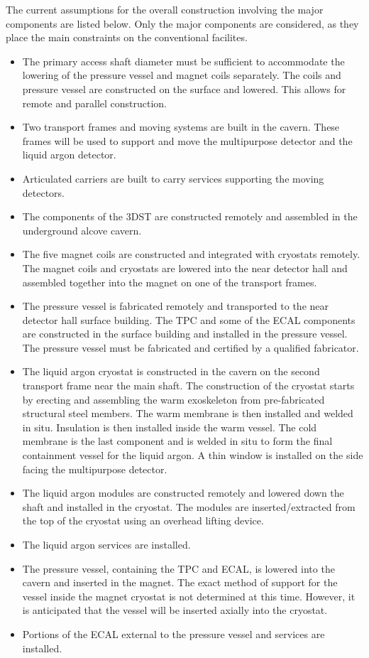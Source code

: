 The current assumptions for the overall construction involving the major components are listed below.  Only the major components are considered, as they place the main constraints on the conventional facilites.
\begin{itemize}
    \item The primary access shaft diameter must be sufficient to  accommodate the lowering of the pressure vessel and magnet coils separately. The coils and pressure vessel are constructed on the surface and lowered. This allows for remote and parallel construction.
    \item Two transport frames and moving systems are built in the cavern.  These frames will be used to support and move the multipurpose detector and the liquid argon detector.
    \item Articulated carriers are built to carry services supporting the moving detectors.
    \item The components of the 3DST are constructed remotely and assembled in the underground alcove cavern.  
    \item The five magnet coils are constructed and integrated with cryostats remotely.  The magnet coils and cryostats are lowered into the near detector hall and assembled together into the magnet on one of the transport frames.
    \item The pressure vessel is fabricated remotely and transported to the near detector hall surface building.  The TPC and some of the ECAL components are constructed in the surface building and installed in the pressure vessel.  The pressure vessel must be fabricated and certified by a qualified fabricator.
    \item The liquid argon cryostat is constructed in the cavern on the second transport frame near the main shaft.  The construction of the cryostat starts by erecting and assembling the warm exoskeleton from pre-fabricated structural steel members. The warm membrane is then installed and welded in situ. Insulation is then installed inside the warm vessel. The cold membrane is the last component and is welded in situ to form the final containment vessel for the liquid argon. A thin window is installed on the side facing the multipurpose detector. 
    \item The liquid argon modules are constructed remotely and lowered down the shaft and installed in the cryostat. The modules are inserted/extracted from the  top of the cryostat using an overhead lifting device. 
    \item The liquid argon services are installed.
    \item The pressure vessel, containing the TPC and ECAL, is lowered into the cavern and inserted in the magnet.  The exact method of support for the vessel inside the magnet cryostat is not determined at this time.   However, it is anticipated that the vessel will be inserted axially into the cryostat.
    \item Portions of the ECAL external to the pressure vessel and services are installed.
\end{itemize}
